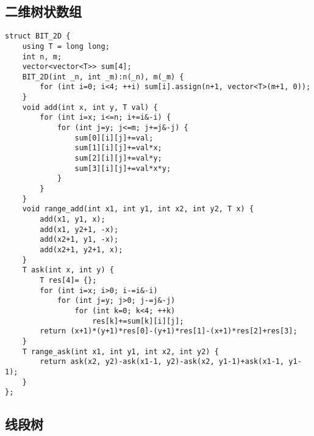 \subsection{二维树状数组}
\begin{lstlisting}
struct BIT_2D {
    using T = long long;
    int n, m;
    vector<vector<T>> sum[4];
    BIT_2D(int _n, int _m):n(_n), m(_m) {
        for (int i=0; i<4; ++i) sum[i].assign(n+1, vector<T>(m+1, 0));
    }
    void add(int x, int y, T val) {
        for (int i=x; i<=n; i+=i&-i) {
            for (int j=y; j<=m; j+=j&-j) {
                sum[0][i][j]+=val;
                sum[1][i][j]+=val*x;
                sum[2][i][j]+=val*y;
                sum[3][i][j]+=val*x*y;
            }
        }
    }
    void range_add(int x1, int y1, int x2, int y2, T x) {
        add(x1, y1, x);
        add(x1, y2+1, -x);
        add(x2+1, y1, -x);
        add(x2+1, y2+1, x);
    }
    T ask(int x, int y) {
        T res[4]= {};
        for (int i=x; i>0; i-=i&-i)
            for (int j=y; j>0; j-=j&-j)
                for (int k=0; k<4; ++k)
                    res[k]+=sum[k][i][j];
        return (x+1)*(y+1)*res[0]-(y+1)*res[1]-(x+1)*res[2]+res[3];
    }
    T range_ask(int x1, int y1, int x2, int y2) {
        return ask(x2, y2)-ask(x1-1, y2)-ask(x2, y1-1)+ask(x1-1, y1-1);
    }
};
\end{lstlisting}

\subsection{线段树}
